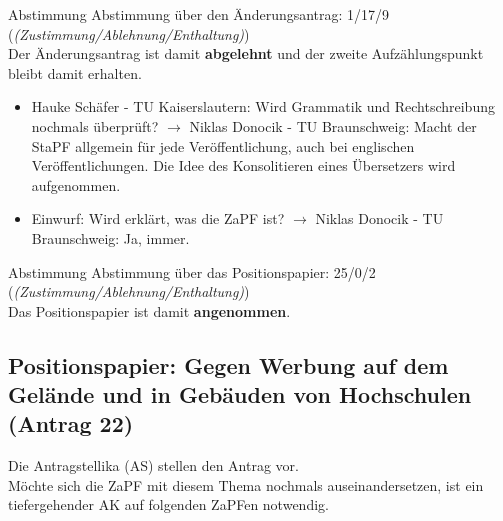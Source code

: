     \begin{danger}{Abstimmung}
      Abstimmung über den Änderungsantrag: 1/17/9 (\textit{(Zustimmung/Ablehnung/Enthaltung)}) \\
      Der Änderungsantrag ist damit \textbf{abgelehnt} und der zweite Aufzählungspunkt bleibt damit erhalten.
    \end{danger}

    \begin{itemize}
      \item Hauke Schäfer - TU Kaiserslautern:  Wird Grammatik und Rechtschreibung nochmals überprüft?
        $\rightarrow$ Niklas Donocik - TU Braunschweig:  Macht der StaPF allgemein für jede Veröffentlichung, auch bei englischen Veröffentlichungen. Die Idee des Konsolitieren eines Übersetzers wird aufgenommen.
      \item Einwurf: Wird erklärt, was die ZaPF ist?
        $\rightarrow$ Niklas Donocik - TU Braunschweig:  Ja, immer.
    \end{itemize}

    \begin{success}{Abstimmung}
      Abstimmung über das Positionspapier: 25/0/2 (\textit{(Zustimmung/Ablehnung/Enthaltung)}) \\
      Das Positionspapier ist damit \textbf{angenommen}.
    \end{success}

  \subsection{Positionspapier: Gegen Werbung auf dem Gelände und in Gebäuden von Hochschulen (Antrag 22)}
    Die Antragstellika (AS) stellen den Antrag vor. \\
    Möchte sich die ZaPF mit diesem Thema nochmals auseinandersetzen, ist ein tiefergehender AK auf folgenden ZaPFen notwendig.

